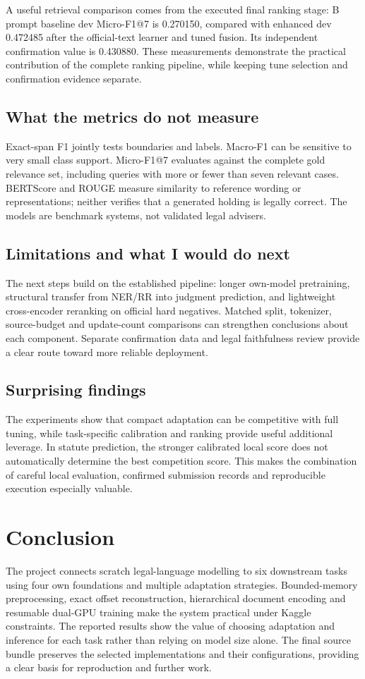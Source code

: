 \documentclass[11pt, oneside]{article}
\begin{document}
A useful retrieval comparison comes from the executed final ranking stage: B prompt
baseline dev Micro-F1@7 is 0.270150, compared with enhanced dev 0.472485 after the
official-text learner and tuned fusion. Its independent confirmation value is 0.430880.
These measurements demonstrate the practical contribution of the complete ranking
pipeline, while keeping tune selection and confirmation evidence separate.

\subsection{What the metrics do not measure}
Exact-span F1 jointly tests boundaries and labels. Macro-F1 can be sensitive to very
small class support. Micro-F1@7 evaluates against the complete gold relevance set,
including queries with more or fewer than seven relevant cases. BERTScore and ROUGE
measure similarity to reference wording or representations; neither verifies that
a generated holding is legally correct. The models are benchmark systems, not
validated legal advisers.

\subsection{Limitations and what I would do next}
The next steps build on the established pipeline: longer own-model pretraining,
structural transfer from NER/RR into judgment prediction, and lightweight cross-encoder
reranking on official hard negatives. Matched split, tokenizer, source-budget and
update-count comparisons can strengthen conclusions about each component. Separate
confirmation data and legal faithfulness review provide a clear route toward more
reliable deployment.

\subsection{Surprising findings}
The experiments show that compact adaptation can be competitive with full tuning,
while task-specific calibration and ranking provide useful additional leverage.
In statute prediction, the stronger calibrated local score does not automatically
determine the best competition score. This makes the combination of careful local
evaluation, confirmed submission records and reproducible execution especially valuable.

\section{Conclusion}
The project connects scratch legal-language modelling to six downstream tasks using
four own foundations and multiple adaptation strategies. Bounded-memory preprocessing,
exact offset reconstruction, hierarchical document encoding and resumable dual-GPU
training make the system practical under Kaggle constraints. The reported results
show the value of choosing adaptation and inference for each task rather than relying
on model size alone. The final source bundle preserves the selected implementations
and their configurations, providing a clear basis for reproduction and further work.
\end{document}
